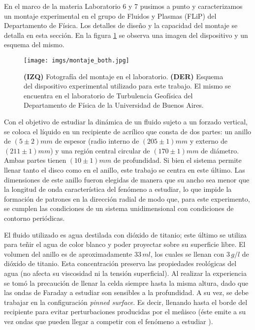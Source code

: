 \documentclass[../main.tex]{subfiles}
\begin{document}
En el marco de la materia Laboratorio 6 y 7 pusimos a punto y caracterizamos un montaje experimental en el grupo de Fluidos y Plasmas (FLiP) del Departamento de Física. Los detalles de diseño y la capacidad del montaje se detalla en esta sección. En la figura \ref{img:montaje} se observa una imagen del dispositivo y un esquema del mismo. 

\begin{figure}[H]
    \centering
    \texttt{[image: imgs/montaje\_both.jpg]}
    \caption{\textbf{(IZQ)} Fotografía del montaje en el laboratorio. \textbf{(DER)} Esquema del dispositivo experimental utilizado para este trabajo. El mismo se encuentra en el laboratorio de Turbulencia Geofísica del Departamento de Física de la Universidad de Buenos Aires.}
    \label{img:montaje}
\end{figure}


Con el objetivo de estudiar la dinámica de un fluido sujeto a un forzado vertical, se coloca el líquido en un recipiente de acrílico que consta de dos partes: un anillo de $(5\pm 2)\si{mm}$  de espesor (radio interno de $(205\pm1)\si{mm}$ y externo de $(211\pm1)\si{mm}$) y una región central circular de $(170 \pm 1)\si{mm}$ de diámetro. Ambas partes tienen $(10\pm1)\si{mm}$ de profundidad. Si bien el sistema permite llenar tanto el disco como en el anillo, este trabajo se centra en este último. Las dimensiones de este anillo fueron elegidas de manera que su ancho sea menor que la longitud de onda característica del fenómeno a estudiar, lo que impide la formación de patrones en la dirección radial de modo que, para este experimento, se cumplen las condiciones de un sistema unidimensional con condiciones de contorno periódicas. 

El fluido utilizado es agua destilada con dióxido de titanio; este último se utiliza para teñir el agua de color blanco y poder proyectar sobre su superficie libre. El volumen del anillo es de aproximadamente $33\,\si{ml}$, los cuales se llenan con $3\,\si{g/l}$ de dióxido de titanio. Esta concentración preserva las propiedades reológicas del agua (no afecta su viscosidad ni la tensión superficial). Al realizar la experiencia se tomó la precaución de llenar la celda siempre hasta la misma altura, dado que las ondas de Faraday a estudiar son sensibles a la profundidad. A su vez, se debe trabajar en la configuración \textit{pinned surface}. Es decir, llenando hasta el borde del recipiente para evitar perturbaciones producidas por el meñisco (éste emite a su vez ondas que pueden llegar a competir con el fenómeno a estudiar \cite{douady_experimental_1990}). 
\end{document}
